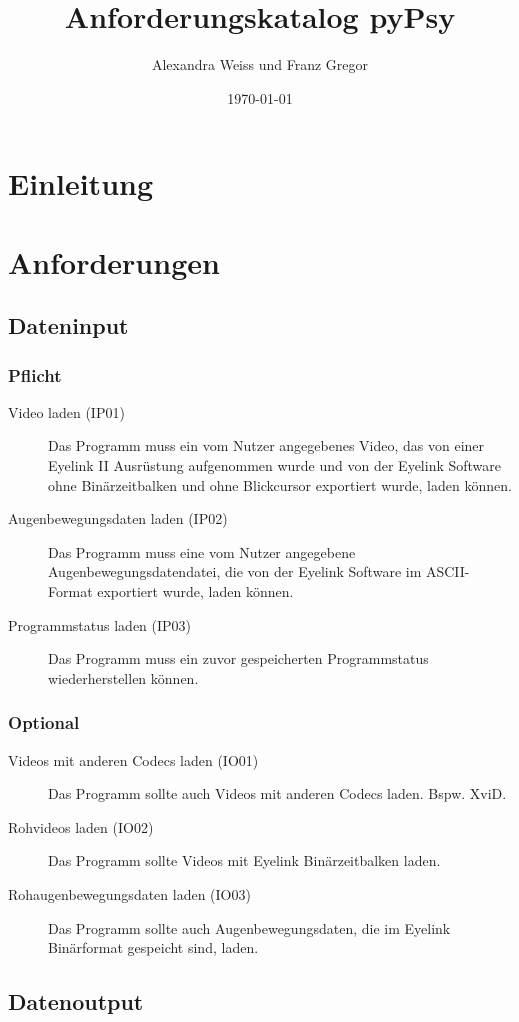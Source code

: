 \documentclass[a4paper]{scrartcl}
\title{Anforderungskatalog pyPsy}
\author{Alexandra Weiss und Franz Gregor}
\date{\today}
\begin{document}
\maketitle
\pagebreak
\section{Einleitung}

\section{Anforderungen}
  \subsection{Dateninput}
    \subsubsection{Pflicht}
      \begin{description}
	\item[Video laden (IP01)] Das Programm muss ein vom Nutzer angegebenes Video, das von einer Eyelink II Ausrüstung aufgenommen wurde und von der Eyelink Software ohne Binärzeitbalken und ohne Blickcursor exportiert wurde, laden können.
	\item[Augenbewegungsdaten laden (IP02)] Das Programm muss eine vom Nutzer angegebene Augenbewegungsdatendatei, die von der Eyelink Software im ASCII-Format exportiert wurde, laden können.
	\item[Programmstatus laden (IP03)] Das Programm muss ein zuvor gespeicherten Programmstatus wiederherstellen können.
      \end{description}
    \subsubsection{Optional}
      \begin{description}
	\item[Videos mit anderen Codecs laden (IO01)] Das Programm sollte auch Videos mit anderen Codecs laden. Bspw. XviD.
	\item[Rohvideos laden (IO02)] Das Programm sollte Videos mit Eyelink Binärzeitbalken laden.
	\item[Rohaugenbewegungsdaten laden (IO03)] Das Programm sollte auch Augenbewegungsdaten, die im Eyelink Binärformat gespeicht sind, laden.
      \end{description}
  \subsection{Datenoutput}
\end{document}
